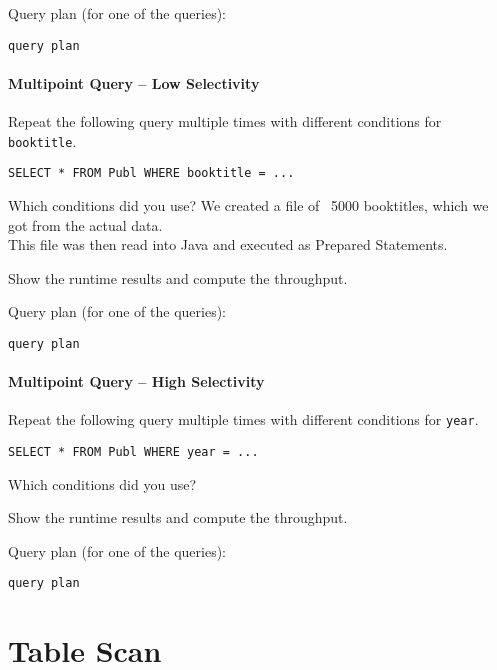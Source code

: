 \documentclass[11pt]{scrartcl}
\begin{document}
\smallskip\noindent
Query plan (for one of the queries):
{\small
\begin{verbatim}
query plan
\end{verbatim}
}


\paragraph{Multipoint Query -- Low Selectivity}

Repeat the following query multiple times with different conditions for {\tt booktitle}.

{\small
\begin{verbatim}
SELECT * FROM Publ WHERE booktitle = ...
\end{verbatim}
}

\noindent
Which conditions did you use?
We created a file of ~5000 booktitles, which we got from the actual data.\\
This file was then read into Java and executed as Prepared Statements.

\smallskip\noindent
Show the runtime results and compute the throughput.

\smallskip\noindent
Query plan (for one of the queries):
{\small
\begin{verbatim}
query plan
\end{verbatim}
}


\paragraph{Multipoint Query -- High Selectivity}

Repeat the following query multiple times with different conditions for {\tt year}.

{\small
\begin{verbatim}
SELECT * FROM Publ WHERE year = ...
\end{verbatim}
}

\noindent
Which conditions did you use?

\smallskip\noindent
Show the runtime results and compute the throughput.

\smallskip\noindent
Query plan (for one of the queries):
{\small
\begin{verbatim}
query plan
\end{verbatim}
}


\section{Table Scan}
\end{document}
